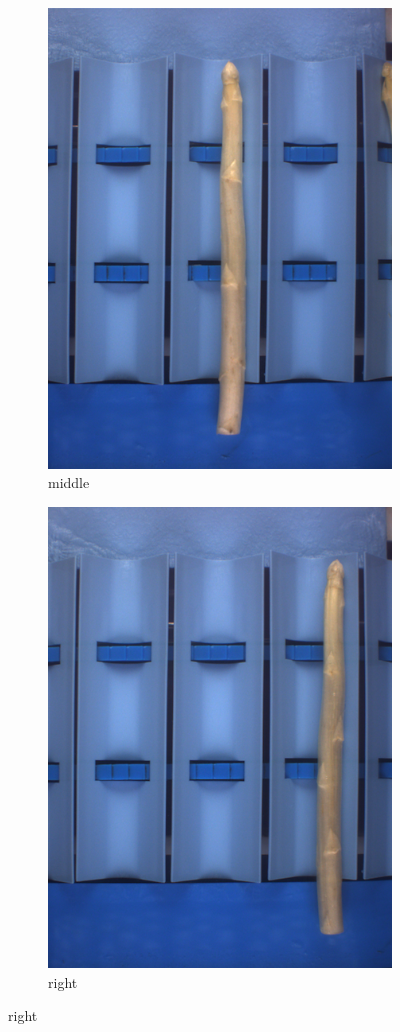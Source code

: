 \begin{figure}[h]
\begin{subfigure}{0.3\textwidth}
		\includegraphics[width=0.9\linewidth]{Figures/chapter02/querdel_b.png}
		\caption{middle}
	\end{subfigure}
	\begin{subfigure}{0.3\textwidth}
		\includegraphics[width=0.9\linewidth]{Figures/chapter02/querdel_c.png}
		\caption{right}
	\end{subfigure}
	

\end{figure}
